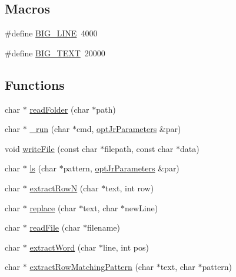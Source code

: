\subsection*{Macros}
\begin{DoxyCompactItemize}
\item 
\#define \hyperlink{invokePredictor__helper_8hh_adf5fb2a227e3abadea9424e33cc02705}{B\-I\-G\-\_\-\-L\-I\-N\-E}~4000
\item 
\#define \hyperlink{invokePredictor__helper_8hh_af5bc9b073dea33e26386656ad6be5ef7}{B\-I\-G\-\_\-\-T\-E\-X\-T}~20000
\end{DoxyCompactItemize}
\subsection*{Functions}
\begin{DoxyCompactItemize}
\item 
char $\ast$ \hyperlink{invokePredictor__helper_8hh_a28d1d79b02f44f349115bf4c9e754770}{read\-Folder} (char $\ast$path)
\item 
char $\ast$ \hyperlink{invokePredictor__helper_8hh_a0f49de720b1b8bcb143e37e9e8a5ab39}{\-\_\-run} (char $\ast$cmd, \hyperlink{classoptJrParameters}{opt\-Jr\-Parameters} \&par)
\item 
void \hyperlink{invokePredictor__helper_8hh_a7eb7b34e9ea84bfbed4afbf5f63dd024}{write\-File} (const char $\ast$filepath, const char $\ast$data)
\item 
char $\ast$ \hyperlink{invokePredictor__helper_8hh_ab01a14d4a3e7b93f83060c8664c3bc42}{ls} (char $\ast$pattern, \hyperlink{classoptJrParameters}{opt\-Jr\-Parameters} \&par)
\item 
char $\ast$ \hyperlink{invokePredictor__helper_8hh_af8e06c5020e70e2f740101fc7bed6fea}{extract\-Row\-N} (char $\ast$text, int row)
\item 
char $\ast$ \hyperlink{invokePredictor__helper_8hh_a66e21ca5b85d790af9025eb13f4beca5}{replace} (char $\ast$text, char $\ast$new\-Line)
\item 
char $\ast$ \hyperlink{invokePredictor__helper_8hh_aec83b878d49ef5976f2175867cdc2d82}{read\-File} (char $\ast$filename)
\item 
char $\ast$ \hyperlink{invokePredictor__helper_8hh_af6244416f7b414764278d2f5cdfe262c}{extract\-Word} (char $\ast$line, int pos)
\item 
char $\ast$ \hyperlink{invokePredictor__helper_8hh_abf4e66cc6aa015a35688c049d4f72ade}{extract\-Row\-Matching\-Pattern} (char $\ast$text, char $\ast$pattern)
\end{DoxyCompactItemize}


